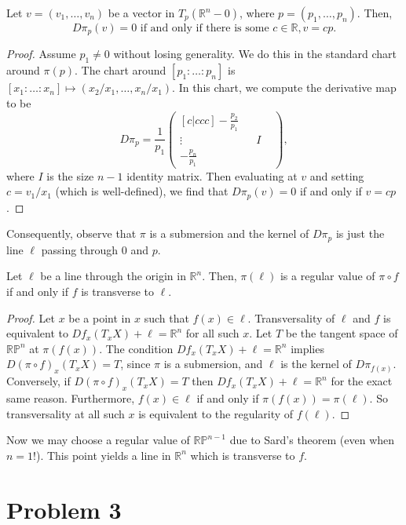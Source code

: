 \documentclass{amsbook}
\theoremstyle{theorem}
\theoremstyle{plain}
\theoremstyle{remark}
\newcommand{\R}{\mathbb R}
\renewcommand{\P}{\mathbb P}
\begin{document}
\begin{lemma}
  Let $v = (v_1,\dots, v_n)$ be a vector in $T_p(\R^n - 0)$, where $p = (p_1, \dots, p_n)$. Then, \[D\pi_p(v) = 0 \text{ if and only if there is some } c \in \R, v = cp.\]
\end{lemma}
\begin{proof}
  Assume $p_1 \neq 0$ without losing generality. We do this in the standard chart around $\pi(p)$. The chart around $[p_1:\dots:p_n]$ is $[x_1:\dots:x_n] \mapsto (x_2/x_1, \dots, x_n/x_1)$. In this chart, we compute the derivative map to be \[D\pi_p =
    \frac{1}{p_1}\begin{pmatrix}[c|ccc]
                   -\tfrac{p_2}{p_1} & &&\\
                   \vdots &  & I &\\
                   -\tfrac{p_n}{p_1}&&&
    \end{pmatrix},\] where $I$ is the size $n-1$ identity matrix. Then evaluating at $v$ and setting $c = v_1/x_1$ (which is well-defined), we find that $D\pi_p(v) = 0$ if and only if $v = cp$.
\end{proof}
Consequently, observe that $\pi$ is a submersion and the kernel of $D\pi_p$ is just the line $\ell$ passing through $0$ and $p$. 
\begin{lemma}
  Let $\ell$ be a line through the origin in $\R^n$. Then, $\pi(\ell)$ is a regular value of $\pi\circ f$ if and only if $f$ is transverse to $\ell$. 
\end{lemma}
\begin{proof}
  Let $x$ be a point in $x$ such that $f(x) \in \ell$. Transversality of $\ell$ and $f$ is equivalent to $Df_x(T_xX) + \ell = \R^n$ for all such $x$. Let $T$ be the tangent space of $\R\P^n$ at $\pi(f(x))$. The condition $Df_x(T_xX) + \ell = \R^n$ implies $D(\pi\circ f)_x(T_xX) = T$, since $\pi$ is a submersion, and $\ell$ is the kernel of $D\pi_{f(x)}$. Conversely, if $D(\pi\circ f)_x(T_xX) = T$ then $Df_x(T_xX) + \ell = \R^n$ for the exact same reason. Furthermore, $f(x) \in \ell$ if and only if $\pi(f(x)) = \pi(\ell)$. So transversality at all such $x$ is equivalent to the regularity of $f(\ell)$. 
\end{proof}

Now we may choose a regular value of $\R\P^{n-1}$ due to Sard's theorem (even when $n = 1$!). This point yields a line in $\R^n$ which is transverse to $f$.
\chapter*{Problem 3}
\end{document}
